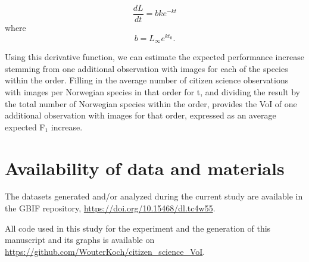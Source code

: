 \documentclass{article}
\begin{document}
\[ \frac{dL}{dt} = bke^{-kt} \]
where
\[ b = L_\infty e^{kt_0}. \]

Using this derivative function, we can estimate the expected performance increase stemming from one additional observation with images for each of the species within the order. Filling in the average number of citizen science observations with images per Norwegian species in that order for t, and dividing the result by the total number of Norwegian species within the order, provides the VoI of one additional observation with images for that order, expressed as an average expected F\(_1\) increase.

\printbibliography


\section*{Availability of data and materials}
The datasets generated and/or analyzed during the current study are available in the GBIF repository, \url{https://doi.org/10.15468/dl.tc4w55}.

All code used in this study for the experiment and the generation of this manuscript and its graphs is available on \url{https://github.com/WouterKoch/citizen_science_VoI}.
\end{document}
